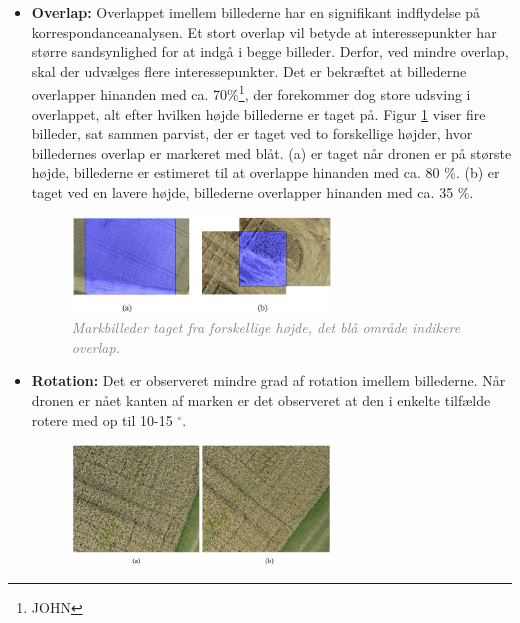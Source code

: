 \begin{itemize}
\item{\textbf{Overlap:} Overlappet imellem billederne har en signifikant indflydelse på korrespondanceanalysen. Et stort overlap vil betyde at interessepunkter har større sandsynlighed for at indgå i begge billeder. Derfor, ved mindre overlap, skal der udvælges flere interessepunkter. Det er bekræftet at billederne overlapper hinanden med ca. 70\%\footnote{JOHN}, der forekommer dog store udsving i overlappet, alt efter hvilken højde billederne er taget på. Figur \ref{fig:overlap} viser fire billeder, sat sammen parvist, der er taget ved to forskellige højder, hvor billedernes overlap er markeret med blåt. (a) er taget når dronen er på største højde, billederne er estimeret til at overlappe hinanden med ca. 80 $\%$. (b) er taget ved en lavere højde, billederne overlapper hinanden med ca. 35 $\%$.
\begin{figure}[H]
    \centering
    \includegraphics[width=0.65\textwidth]{fig/17.png}
     \vspace{-1em}
    \begin{center}    
       \caption{\textcolor{gray}{\footnotesize \textit{Markbilleder taget fra forskellige højde, det blå område indikere overlap.}}}
    \label{fig:overlap}
     \end{center}
     \vspace{-2.5em}
  \end{figure} \noindent }
\item{\textbf{Rotation:} Det er observeret mindre grad af rotation imellem billederne. Når dronen er nået kanten af marken er det observeret at den i enkelte tilfælde rotere med op til 10-15 $^{\circ}$.
\begin{figure}[H]
    \centering
    \includegraphics[width=0.65\textwidth]{fig/19.png}

\end{figure}}
\end{itemize}
